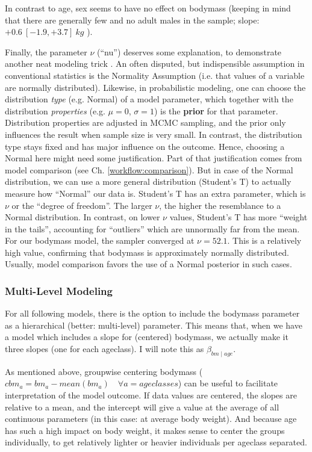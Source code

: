 In contrast to age, sex seems to have no effect on bodymass (keeping in mind that there are generally few and no adult males in the sample; slope: \(+0.6\ [-1.9, +3.7]\ kg\) ).

Finally, the parameter \(\nu\) (``nu'') deserves some explanation, to demonstrate another neat modeling trick \citep{Wiecki2013}.
An often disputed, but indispensible assumption in conventional statistics is the Normality Assumption (i.e. that values of a variable are normally distributed).
Likewise, in probabilistic modeling, one can choose the distribution \emph{type} (e.g. Normal) of a model parameter, which together with the distribution \emph{properties} (e.g. \(\mu = 0\), \(\sigma = 1\)) is the \textbf{prior} for that parameter.
Distribution properties are adjusted in MCMC sampling, and the prior only influences the result when sample size is very small.
In contrast, the distribution type stays fixed and has major influence on the outcome.
Hence, choosing a Normal here might need some justification.
Part of that justification comes from model comparison (see Ch. \ref{workflow:comparison}).
But in case of the Normal distribution, we can use a more general distribution (Student's T) to actually measure how ``Normal'' our data is.
Student's T has an extra parameter, which is \(\nu\) or the ``degree of freedom''.
The larger \(\nu\), the higher the resemblance to a Normal distribution.
In contrast, on lower \(\nu\) values, Student's T has more ``weight in the tails'', accounting for ``outliers'' which are unnormally far from the mean.
For our bodymass model, the sampler converged at \(\nu = 52.1\).
This is a relatively high value, confirming that bodymass is approximately normally distributed.
Usually, model comparison favors the use of a Normal posterior in such cases.


\subsubsection{Multi-Level Modeling}
\label{sec:org25b6e1a}
For all following models, there is the option to include the bodymass parameter as a hierarchical (better: multi-level) parameter.
This means that, when we have a model which includes a slope for (centered) bodymass, we actually make it three slopes (one for each ageclass). I will note this as \(\beta_{bm\mid age}\).

As mentioned above, groupwise centering bodymass (\(cbm_a = bm_a - mean(bm_a)\quad \forall a = {ageclasses}\)) can be useful to facilitate interpretation of the model outcome.
If data values are centered, the slopes are relative to a mean, and the intercept will give a value at the average of all continuous parameters (in this case: at average body weight).
And because age has such a high impact on body weight, it makes sense to center the groups individually, to get relatively lighter or heavier individuals per ageclass separated.


